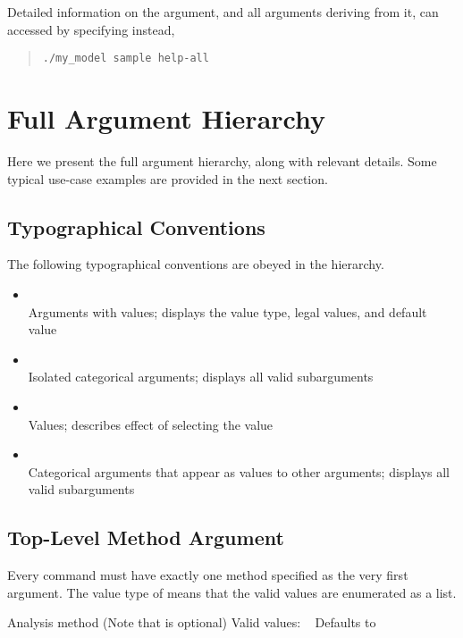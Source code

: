 Detailed information on the argument, and all arguments deriving
from it, can accessed by specifying  instead,
%
\begin{quote}
\begin{Verbatim}[fontshape=sl]
./my_model sample help-all
\end{Verbatim}
\end{quote}

\section{Full Argument Hierarchy}\label{detailed-command-arguments.section}

Here we present the full argument hierarchy, along with relevant details.
Some typical use-case examples are provided in the next section.

\subsection{Typographical Conventions}

The following typographical conventions are obeyed in the hierarchy.
%
\begin{itemize}
\item {}
\\
Arguments with values; displays the value type, legal values, and default value
%
\item {}
\\
Isolated categorical arguments; displays all valid subarguments
%
\item {}
\\
Values; describes effect of selecting the value
%
\item {}
\\
Categorical arguments that appear as values to other arguments; displays all valid subarguments
\end{itemize}

\subsection{Top-Level Method Argument}

Every command must have exactly one method specified as the very first
argument.  The value type of  means that the valid
values are enumerated as a list.

\begin{description}
  {Analysis method (Note that  is optional)}
  {Valid values: \  }
  {Defaults to }
\end{description}

